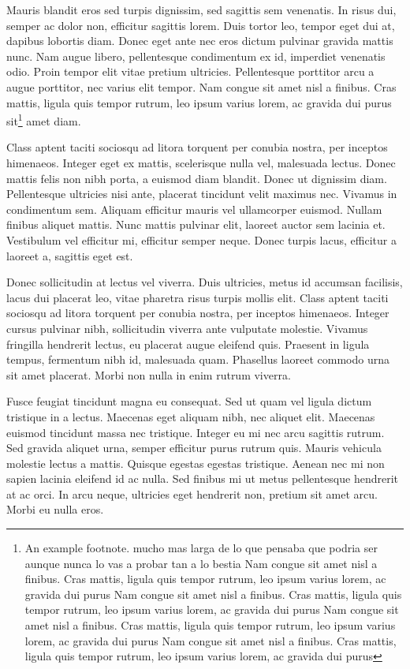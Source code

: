 Mauris blandit eros sed turpis dignissim, sed sagittis sem venenatis. In risus dui, semper ac dolor non, efficitur sagittis lorem. Duis tortor leo, tempor eget dui at, dapibus lobortis diam. Donec eget ante nec eros dictum pulvinar gravida mattis nunc. Nam augue libero, pellentesque condimentum ex id, imperdiet venenatis odio. Proin tempor elit vitae pretium ultricies. Pellentesque porttitor arcu a augue porttitor, nec varius elit tempor. Nam congue sit amet nisl a finibus. Cras mattis, ligula quis tempor rutrum, leo ipsum varius lorem, ac gravida dui purus sit\footnote{An example footnote. mucho mas larga de lo que pensaba que podria ser aunque nunca lo vas a probar tan a lo bestia Nam congue sit amet nisl a finibus. Cras mattis, ligula quis tempor rutrum, leo ipsum varius lorem, ac gravida dui purus Nam congue sit amet nisl a finibus. Cras mattis, ligula quis tempor rutrum, leo ipsum varius lorem, ac gravida dui purus Nam congue sit amet nisl a finibus. Cras mattis, ligula quis tempor rutrum, leo ipsum varius lorem, ac gravida dui purus Nam congue sit amet nisl a finibus. Cras mattis, ligula quis tempor rutrum, leo ipsum varius lorem, ac gravida dui purus } amet diam.

Class aptent taciti sociosqu ad litora torquent per conubia nostra, per inceptos himenaeos. Integer eget ex mattis, scelerisque nulla vel, malesuada lectus. Donec mattis felis non nibh porta, a euismod diam blandit. Donec ut dignissim diam. Pellentesque ultricies nisi ante, placerat tincidunt velit maximus nec. Vivamus in condimentum sem. Aliquam efficitur mauris vel ullamcorper euismod. Nullam finibus aliquet mattis. Nunc mattis pulvinar elit, laoreet auctor sem lacinia et. Vestibulum vel efficitur mi, efficitur semper neque. Donec turpis lacus, efficitur a laoreet a, sagittis eget est.

Donec sollicitudin at lectus vel viverra. Duis ultricies, metus id accumsan facilisis, lacus dui placerat leo, vitae pharetra risus turpis mollis elit. Class aptent taciti sociosqu ad litora torquent per conubia nostra, per inceptos himenaeos. Integer cursus pulvinar nibh, sollicitudin viverra ante vulputate molestie. Vivamus fringilla hendrerit lectus, eu placerat augue eleifend quis. Praesent in ligula tempus, fermentum nibh id, malesuada quam. Phasellus laoreet commodo urna sit amet placerat. Morbi non nulla in enim rutrum viverra.

Fusce feugiat tincidunt magna eu consequat. Sed ut quam vel ligula dictum tristique in a lectus. Maecenas eget aliquam nibh, nec aliquet elit. Maecenas euismod tincidunt massa nec tristique. Integer eu mi nec arcu sagittis rutrum. Sed gravida aliquet urna, semper efficitur purus rutrum quis. Mauris vehicula molestie lectus a mattis. Quisque egestas egestas tristique. Aenean nec mi non sapien lacinia eleifend id ac nulla. Sed finibus mi ut metus pellentesque hendrerit at ac orci. In arcu neque, ultricies eget hendrerit non, pretium sit amet arcu. Morbi eu nulla eros.

